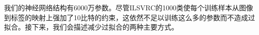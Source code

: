 我们的神经网络结构有6000万参数。尽管ILSVRC的1000类使每个训练样本从图像到标签的映射上强加了10比特的约束，这依然不足以训练这么多的参数而不造成过拟合。接下来，我们会描述减少过拟合的两种主要方式。\\